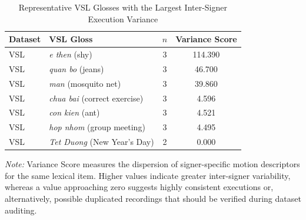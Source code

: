 \documentclass{ieeeaccess}
\begin{document}
\begin{table}[!t]
\caption{Representative VSL Glosses with the Largest Inter-Signer Execution Variance}
\label{tab:app_signer}

\centering
\small
\setlength{\tabcolsep}{6pt}

\begin{tabular}{llcc}
\toprule
\textbf{Dataset} &
\textbf{VSL Gloss} &
\textbf{$n$} &
\textbf{Variance Score} \\
\midrule

VSL &
\textit{e then} (shy) &
3 &
114.390 \\

VSL &
\textit{quan bo} (jeans) &
3 &
46.700 \\

VSL &
\textit{man} (mosquito net) &
3 &
39.860 \\

VSL &
\textit{chua bai} (correct exercise) &
3 &
4.596 \\

VSL &
\textit{con kien} (ant) &
3 &
4.521 \\

VSL &
\textit{hop nhom} (group meeting) &
3 &
4.495 \\

VSL &
\textit{Tet Duong} (New Year's Day) &
2 &
0.000 \\

\bottomrule
\end{tabular}

\vspace{2mm}

\footnotesize
\textit{Note:}
Variance Score measures the dispersion of signer-specific motion descriptors for the same lexical item.
Higher values indicate greater inter-signer variability, whereas a value approaching zero suggests highly consistent executions or, alternatively, possible duplicated recordings that should be verified during dataset auditing.

\end{table}
\end{document}
